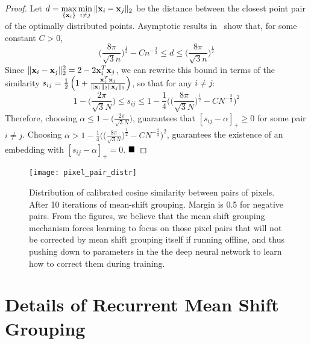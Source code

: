 \documentclass[10pt,twocolumn,letterpaper]{article}
\def\x{{\bf x}}
\newtheorem{proof}{Proof}
\begin{document}
\begin{proof}
Let $d  = \max\limits_{\{\x_i\}} \min\limits_{i\not=j}\Vert \x_i-\x_j\Vert_2$
be the distance between the closest point pair of the optimally distributed
points.  Asymptotic results in~\cite{habicht1951lagerung} show that, for some
constant $C>0$,
\begin{equation}
  \Big(\frac{8\pi}{\sqrt{3}n}\Big)^{\frac{1}{2}} -Cn^{-\frac{2}{3}} \le d \le \Big( \frac{8\pi}{\sqrt{3}n} \Big)^{\frac{1}{2}}
\end{equation}
Since $\Vert \x_i-\x_j\Vert_2^2=2-2\x_i^T \x_j$, we can rewrite this bound in
terms of the similarity
$s_{ij} = \frac{1}{2}\left(1 + \frac{\x_i^T\x_j}{\Vert\x_i\Vert_2 \Vert\x_j\Vert_2}\right)$,
so that for any $i \not= j$:
\begin{equation}
1- \Big( \frac{2\pi}{\sqrt{3}N} \Big) \le s_{ij} \le  1- \frac{1}{4} \Bigg( \Big(\frac{8\pi}{\sqrt{3}N}\Big)^{\frac{1}{2}} -CN^{-\frac{2}{3}}\Bigg)^2
\end{equation}
Therefore, choosing $\alpha \leq 1- \Big( \frac{2\pi}{\sqrt{3}N} \Big)$,
guarantees that $[s_{ij}-\alpha]_{+}\geq 0$ for some pair $i \not= j$. Choosing
$\alpha > 1- \frac{1}{4} \Bigg( \Big(\frac{8\pi}{\sqrt{3}N}\Big)^{\frac{1}{2}}
-CN^{-\frac{2}{3}}\Bigg)^2$, guarantees the existence of an embedding with
$[s_{ij}-\alpha]_{+}=0$.
$\hfill\blacksquare$
\end{proof}\begin{figure*}[t]
\centering
   \texttt{[image: pixel\_pair\_distr]}
   \caption{Distribution of calibrated cosine similarity between pairs of pixels.
   After 10 iterations of mean-shift grouping.  Margin is 0.5 for negative
   pairs.  From the figures, we believe that the mean shift grouping mechanism
   forces learning to focus on those pixel pairs that will not be corrected by
   mean shift grouping itself if running offline, and thus pushing down to
   parameters in the the deep neural network to learn how to correct them
   during training.
   }
\label{fig:pixel_pair_distr}
\end{figure*}\section{Details of Recurrent Mean Shift Grouping }
\end{document}
